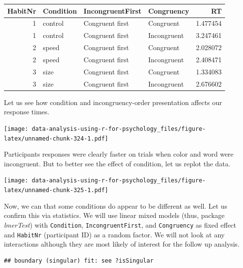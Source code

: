 \documentclass[
]{book}
\begin{document}
\begin{tabular}{r|l|l|l|r}
\hline
HabitNr & Condition & IncongruentFirst & Congruency & RT\\
\hline
1 & control & Congruent first & Congruent & 1.477454\\
\hline
1 & control & Congruent first & Incongruent & 3.247461\\
\hline
2 & speed & Congruent first & Congruent & 2.028072\\
\hline
2 & speed & Congruent first & Incongruent & 2.408471\\
\hline
3 & size & Congruent first & Congruent & 1.334083\\
\hline
3 & size & Congruent first & Incongruent & 2.676602\\
\hline
\end{tabular}

Let us see how condition and incongruency-order presentation affects our response times.

\texttt{[image: data-analysis-using-r-for-psychology\_files/figure-latex/unnamed-chunk-324-1.pdf]}

Participants responses were clearly faster on trials when color and word were incongruent. But to better see the effect of condition, let us replot the data.

\texttt{[image: data-analysis-using-r-for-psychology\_files/figure-latex/unnamed-chunk-325-1.pdf]}

Now, we can that some conditions do appear to be different as well. Let us confirm this via statistics. We will use linear mixed models (thus, package \emph{lmerTest}) with \texttt{Condition}, \texttt{IncongruentFirst}, and \texttt{Congruency} as fixed effect and \texttt{HabitNr} (participant ID) as a random factor. We will not look at any interactions although they are most likely of interest for the follow up analysis.

\begin{verbatim}
## boundary (singular) fit: see ?isSingular
\end{verbatim}
\end{document}
